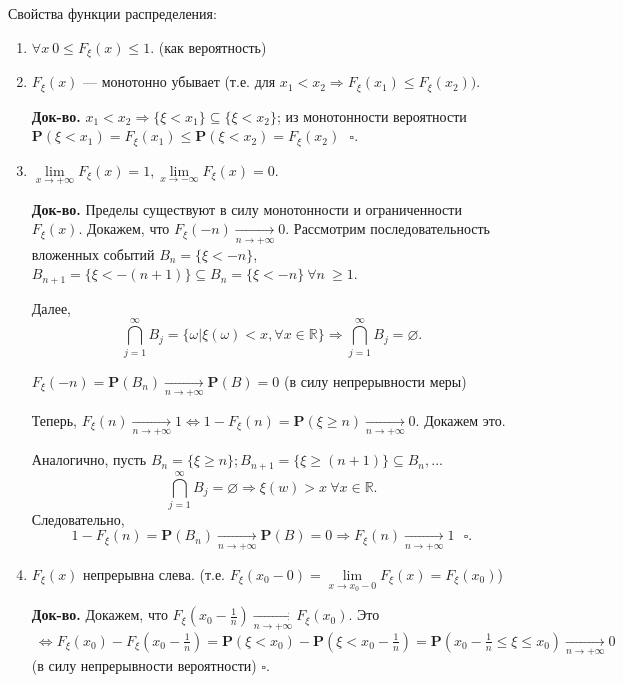 \documentclass[oneside,final,14pt]{extreport}
\newcommand\myqed{{\bf Док-во.}}
\newcommand\myprob[1]{{\mathbf{P}(#1)}}
\theoremstyle{definition}
\begin{document}
Свойства функции распределения:
\begin{enumerate}
    \item $\forall x~ 0 \leq F_\xi(x) \leq 1.$ (как вероятность)
    \item $F_\xi(x)$ --- монотонно убывает (т.е. для $x_1 < x_2 \Rightarrow F_\xi(x_1) \leq F_\xi(x_2)).$
    
    \myqed{} $x_1 < x_2 \Rightarrow \{ \xi < x_1 \} \subseteq \{ \xi < x_2\}$; из монотонности вероятности $\myprob{\xi < x_1} = F_\xi(x_1) \leq \myprob{\xi < x_2} = F_\xi(x_2) ~~~ \square.$ 

    \item $\lim\limits_{x \rightarrow +\infty} F_\xi(x) = 1, \lim\limits_{x \rightarrow -\infty} F_\xi(x) = 0.$
    
    \myqed{} Пределы существуют в силу монотонности и ограниченности $F_\xi(x)$. Докажем, что $F_\xi(-n) \xrightarrow[n \rightarrow +\infty]{} 0.$ Рассмотрим последовательность вложенных событий $B_n = \{ \xi < -n \}$, 
    $B_{n+1} = \{\xi < -(n+1) \} \subseteq B_n = \{ \xi < -n \} ~ \forall n ~ \geq 1.$
    
    Далее, $$\bigcap\limits_{j = 1}^{\infty}B_j = \{ \omega | \xi(\omega) < x, \forall x \in \mathbb{R} \} \Rightarrow \bigcap\limits_{j = 1}^{\infty}B_j = \varnothing.$$
    
    $F_\xi(-n) = \myprob{B_n} \xrightarrow[n \rightarrow +\infty]{} \myprob{B} = 0$ (в силу непрерывности меры)
    
    Теперь, $F_\xi(n) \xrightarrow[n \rightarrow +\infty]{} 1 \Leftrightarrow 1 - F_\xi(n) = \myprob{\xi \geq n} \xrightarrow[n \rightarrow +\infty]{} 0.$ Докажем это.
    
    Аналогично, пусть $B_n = \{\xi \geq n\}; B_{n+1} = \{ \xi \geq (n+1) \} \subseteq B_n, ...$
    $$ \bigcap\limits_{j = 1}^{\infty}B_j = \varnothing \Rightarrow \xi(w) > x~\forall x \in \mathbb{R}. $$
    Следовательно, $$1 - F_\xi(n) = \myprob{B_n} \xrightarrow[n \rightarrow +\infty]{} \myprob{B} = 0 \Rightarrow F_\xi(n) \xrightarrow[n \rightarrow +\infty]{}1 ~~~ \square. $$
    
    \item $F_\xi(x)$ непрерывна слева. (т.е. $F_\xi(x_0 - 0) = \lim\limits_{x \rightarrow x_0 - 0}F_\xi(x) = F_\xi(x_0)$)
    
    \myqed{} Докажем, что $F_\xi(x_0 - \frac{1}{n}) \xrightarrow[n \rightarrow +\infty]{} F_\xi(x_0).$ Это $~\Leftrightarrow F_\xi(x_0) - F_\xi(x_0 - \frac{1}{n}) = \myprob{\xi < x_0} - \myprob{\xi < x_0 - \frac{1}{n}} = \myprob{x_0 - \frac{1}{n} \leq \xi \leq x_0} \xrightarrow[n \rightarrow +\infty]{} 0$ (в силу непрерывности вероятности) $\square.$
\end{enumerate}
\end{document}
